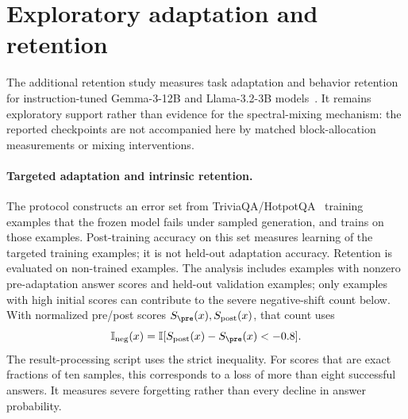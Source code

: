 \section{Exploratory adaptation and retention}
\label{app:retention}

The additional retention study measures task adaptation and behavior retention for instruction-tuned Gemma-3-12B and Llama-3.2-3B models~\citep{gemma3_2025,meta2024llama32}. It remains exploratory support rather than evidence for the spectral-mixing mechanism: the reported checkpoints are not accompanied here by matched block-allocation measurements or mixing interventions.

\paragraph{Targeted adaptation and intrinsic retention.}
The protocol constructs an error set from TriviaQA/HotpotQA~\citep{joshi2017triviaqa,yang2018hotpotqa} training examples that the frozen model fails under sampled generation, and trains on those examples. Post-training accuracy on this set measures learning of the targeted training examples; it is not held-out adaptation accuracy. Retention is evaluated on non-trained examples. The analysis includes examples with nonzero pre-adaptation answer scores and held-out validation examples; only examples with high initial scores can contribute to the severe negative-shift count below. With normalized pre/post scores $S_{\pre}(x),S_{\mathrm{post}}(x)$, that count uses
\begin{equation}
\mathbb I_{\mathrm{neg}}(x)=\mathbb I[S_{\mathrm{post}}(x)-S_{\pre}(x)<-0.8].
\end{equation}
The result-processing script uses the strict inequality. For scores that are exact fractions of ten samples, this corresponds to a loss of more than eight successful answers. It measures severe forgetting rather than every decline in answer probability.

